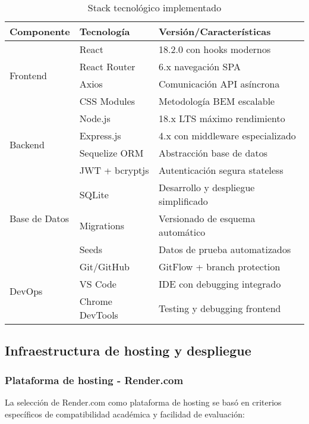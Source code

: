 \begin{table}[H]
\centering
\caption{Stack tecnológico implementado}
\begin{tabular}{|l|l|l|}
\hline
\textbf{Componente} & \textbf{Tecnología} & \textbf{Versión/Características} \\
\hline
\multirow{4}{*}{Frontend} & React & 18.2.0 con hooks modernos \\
\cline{2-3}
& React Router & 6.x navegación SPA \\
\cline{2-3}
& Axios & Comunicación API asíncrona \\
\cline{2-3}
& CSS Modules & Metodología BEM escalable \\
\hline
\multirow{4}{*}{Backend} & Node.js & 18.x LTS máximo rendimiento \\
\cline{2-3}
& Express.js & 4.x con middleware especializado \\
\cline{2-3}
& Sequelize ORM & Abstracción base de datos \\
\cline{2-3}
& JWT + bcryptjs & Autenticación segura stateless \\
\hline
\multirow{3}{*}{Base de Datos} & SQLite & Desarrollo y despliegue simplificado \\
\cline{2-3}
& Migrations & Versionado de esquema automático \\
\cline{2-3}
& Seeds & Datos de prueba automatizados \\
\hline
\multirow{3}{*}{DevOps} & Git/GitHub & GitFlow + branch protection \\
\cline{2-3}
& VS Code & IDE con debugging integrado \\
\cline{2-3}
& Chrome DevTools & Testing y debugging frontend \\
\hline
\end{tabular}
\label{tab:stack_desarrollo}
\end{table}

\subsection{Infraestructura de hosting y despliegue}

\subsubsection{Plataforma de hosting - Render.com}

La selección de Render.com como plataforma de hosting se basó en criterios específicos de compatibilidad académica y facilidad de evaluación:

